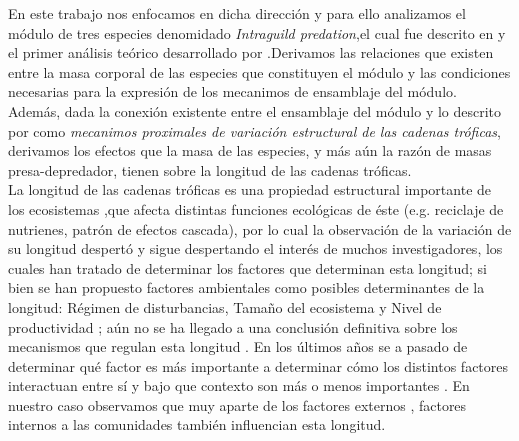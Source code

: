 En este trabajo nos enfocamos en dicha direcci\'on y para ello analizamos el m\'odulo de tres especies denomidado \emph{Intraguild predation},el cual fue descrito en \cite{polis1989ecology} y el primer an\'alisis te\'orico desarrollado por \cite{holt1997theoretical}.Derivamos las relaciones que existen entre la masa corporal de las especies que constituyen el m\'odulo y las condiciones necesarias para la expresi\'on de los mecanimos de ensamblaje del m\'odulo. \\
Adem\'as, dada la conexi\'on existente entre el ensamblaje del m\'odulo y lo descrito por \cite{TP2007proximate} como \emph{mecanimos proximales de variaci\'on estructural de las cadenas tr\'oficas}, derivamos los efectos que la masa de las especies, y m\'as a\'un la raz\'on de masas presa-depredador, tienen sobre la longitud de las cadenas tr\'oficas. \\

La longitud de las cadenas tr\'oficas es una propiedad estructural importante de los ecosistemas ,que afecta distintas funciones ecol\'ogicas de \'este (e.g. reciclaje de nutrienes, patr\'on de efectos cascada), por lo cual  la observaci\'on de la variaci\'on de su longitud despert\'o y sigue despertando el inter\'es de muchos investigadores\citep{ulanowicz2014limits,borrelli2014there}, los cuales han tratado de determinar los factores que determinan esta longitud; si bien se han propuesto factores ambientales como posibles determinantes de la longitud: R\'egimen de disturbancias, Tama\~no del ecosistema y Nivel de productividad \citep{post2002long,takimoto2013environmental}; a\'un no se ha llegado a una conclusi\'on definitiva sobre los mecanismos que regulan esta longitud \citep{sterner1997enigma,takimoto2013environmental}. En los \'ultimos a\~nos se a pasado de determinar qu\'e factor es m\'as importante a determinar c\'omo los distintos factores interactuan entre s\'i y bajo que contexto son m\'as o menos importantes \citep{post2002long}. En nuestro caso observamos que muy aparte de los factores externos , factores internos a las comunidades tambi\'en influencian esta longitud.

